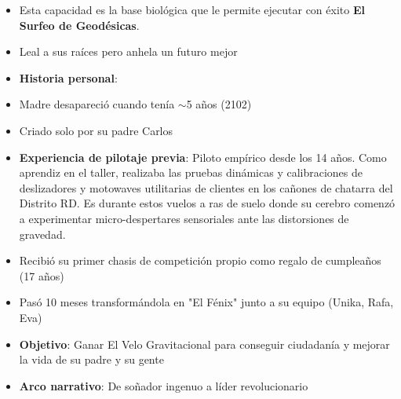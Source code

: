 \documentclass[11pt,a4paper]{report}
\begin{document}
\begin{itemize}
  \item Esta capacidad es la base biológica que le permite ejecutar con éxito \textbf{El Surfeo de Geodésicas}.
  \item Leal a sus raíces pero anhela un futuro mejor
  \item \textbf{Historia personal}:
  \item Madre desapareció cuando tenía $\sim$5 años (2102)
  \item Criado solo por su padre Carlos
  \item \textbf{Experiencia de pilotaje previa}: Piloto empírico desde los 14 años. Como aprendiz en el taller, realizaba las pruebas dinámicas y calibraciones de deslizadores y motowaves utilitarias de clientes en los cañones de chatarra del Distrito RD. Es durante estos vuelos a ras de suelo donde su cerebro comenzó a experimentar micro-despertares sensoriales ante las distorsiones de gravedad.
  \item Recibió su primer chasis de competición propio como regalo de cumpleaños (17 años)
  \item Pasó 10 meses transformándola en "El Fénix" junto a su equipo (Unika, Rafa, Eva)
  \item \textbf{Objetivo}: Ganar El Velo Gravitacional para conseguir ciudadanía y mejorar la vida de su padre y su gente
  \item \textbf{Arco narrativo}: De soñador ingenuo a líder revolucionario

\end{itemize}
\end{document}

